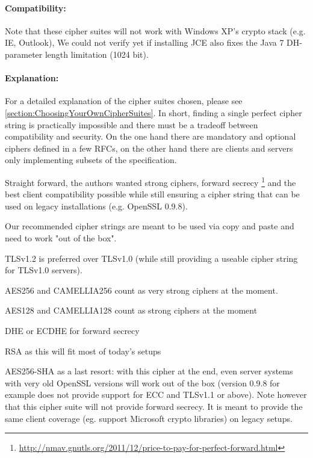 \paragraph*{Compatibility: }

Note that these cipher suites will not work with Windows XP's crypto stack (e.g. IE, Outlook), 
We could not verify yet if installing JCE also fixes the Java 7
DH-parameter length limitation (1024 bit). 

\paragraph*{Explanation: }

For a detailed explanation of the cipher suites chosen, please see
\ref{section:ChoosingYourOwnCipherSuites}. In short, finding a single perfect cipher
string is practically impossible and there must be a tradeoff between compatibility and security. 
On the one hand there are mandatory and optional ciphers defined in a few RFCs, 
on the other hand there are clients and servers only implementing subsets of the 
specification.

Straight forward, the authors wanted strong ciphers, forward secrecy
\footnote{\url{http://nmav.gnutls.org/2011/12/price-to-pay-for-perfect-forward.html}}
and the best client compatibility possible while still ensuring a cipher string that can be
used on legacy installations (e.g. OpenSSL 0.9.8). 

Our recommended cipher strings are meant to be used via copy and paste and need to work
"out of the box".

\begin{itemize*}
  \item TLSv1.2 is preferred over TLSv1.0 (while still providing a useable cipher
      string for TLSv1.0 servers).
  \item AES256 and CAMELLIA256 count as very strong ciphers at the moment.
  \item AES128 and CAMELLIA128 count as strong ciphers at the moment
  \item DHE or ECDHE for forward secrecy
  \item RSA as this will fit most of today's setups
  \item AES256-SHA as a last resort: with this cipher at the end, even server
      systems with very old OpenSSL versions will work out of the box (version 0.9.8 for example does not
      provide support for ECC and TLSv1.1 or above). \newline
      Note however that this cipher suite will not provide forward secrecy. It
      is meant to provide the same client coverage (eg. support Microsoft crypto
      libraries) on legacy setups.
\end{itemize*}
